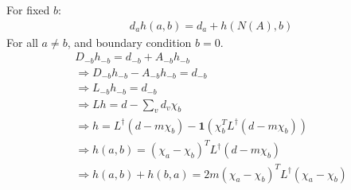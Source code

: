 For fixed $b$:
\begin{align}
& d_a h(a,b) = d_a + h(N(A), b)
\end{align}
For all $a \not = b$, and boundary condition $b = 0$.
\begin{align}
  & D_{-b}h_{-b} = d_{-b} + A_{-b}h_{-b}
\\
  & \Rightarrow D_{-b}h_{-b}  - A_{-b}h_{-b} = d_{-b}
\\
  & \Rightarrow L_{-b}h_{-b}= d_{-b}
\\
  & \Rightarrow Lh = d - \sum_v d_v \chi_b
\\
  & \Rightarrow h = L^{\dag} \left(d - m \chi_b\right) -
  \textbf{1}(\chi_b^T L^{\dag} (d - m\chi_b))
\\
  & \Rightarrow h(a,b) = (\chi_a - \chi_b)^T L^{\dag} \left(d - m \chi_b\right)
\\
  & \Rightarrow h(a,b) +h(b,a)= 2m (\chi_a - \chi_b)^T L^\dag
  (\chi_a - \chi_b)
\end{align}


